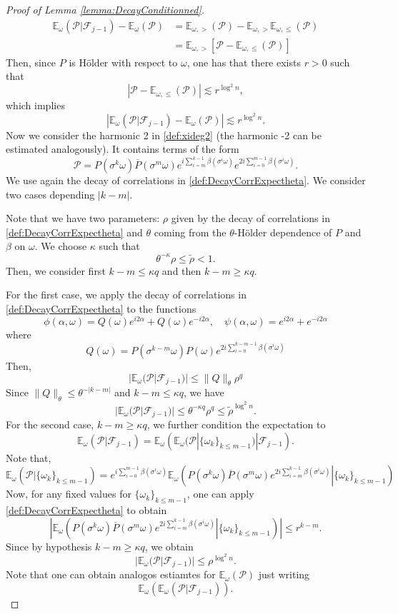 \documentclass[10pt,a4paper]{amsart}
\newcommand{\E}{\mathbb{E}}
\newcommand{\FF}{\mathcal{F}}
\newcommand{\PP}{\mathcal{P}}
\newcommand{\al}{\alpha}
\newcommand{\kk}{\kappa}
\newcommand{\ol}{\overline}
\newcommand{\rr}{\rho}
\newcommand{\wt}{\widetilde}
\begin{document}
\begin{proof}[Proof of Lemma \ref{lemma:DecayConditionned}]
\[
 \begin{split}
\E_\omega\left(\left. \PP\right|\FF_{j-1}\right)-\E_\omega\left( \PP\right)
&=  \E_{\omega,>}(\PP)-\E_{\omega,>}\E_{\omega,\leq}(\PP)\\
  &=\E_{\omega,>}\left[\PP-\E_{\omega,\leq}(\PP)\right]
 \end{split}
\]
Then, since $P$ is H\"older with respect to $\omega$, one has that there exists $r>0$ such that 
\[
 \left|\PP-\E_{\omega,\leq}(\PP)\right|\lesssim r^{\log^2n},
\]
which implies 
\[
\left|\E_\omega(\PP|\FF_{j-1})-\E_\omega(\PP)\right|\lesssim r^{\log^2n}.
\]
Now we consider the harmonic 2 in \eqref{def:xideg2} (the harmonic -2 can be estimated analogously). It contains terms of the form 
\[
\PP= P(\sigma^k\omega)\ol P(\sigma^m\omega)e^{i\sum_{i=m}^{k-1}\beta(\sigma^i\omega)}e^{2i\sum_{i=0}^{m-1}\beta(\sigma^i\omega)}.
\]
We use again the decay of correlations in \eqref{def:DecayCorrExpectheta}. We consider two cases depending $|k-m|$. 

Note that we have two parameters: $\rr$ given by the decay of correlations in \eqref{def:DecayCorrExpectheta} and $\theta$ coming from the $\theta$-H\"older dependence of $P$ and $\beta$ on $\omega$. We choose $\kk$ such that 
\[
 \theta^{-\kk}\rr\leq \wt \rr<1.
\]
Then, we consider first $k-m\leq \kk q$ and then $k-m\geq \kk q$. 

For the first case, we apply the decay of correlations  in \eqref{def:DecayCorrExpectheta} to the functions 
\[
\phi(\al,\omega)=Q(\omega)e^{i2\al}+ Q(\omega)e^{-i2\al},\quad \psi(\al,\omega)=e^{i2\al}+e^{-i2\al}
\]
where
\[
 Q(\omega)=P(\sigma^{k-m}\omega)P(\omega)e^{2i\sum_{i=0}^{k-m-1}\beta(\sigma^i\omega)}
\]
Then,
\[
 |\E_\omega(\PP|\FF_{j-1})|\leq \|Q\|_\theta \rr^q
\]
Since $\|Q\|_\theta\leq \theta^{-|k-m|}$ and $k-m\leq \kk q$, we have
\[
 |\E_\omega(\PP|\FF_{j-1})|\leq \theta^{-\kk q}\rr^q \leq \wt\rr^{\log^2n}.
\]
For the second case, $k-m\geq \kk q$, we further condition the expectation to 
\[
\E_\omega(\PP|\FF_{j-1})=\E_\omega\left(\E_\omega(\PP|\{\omega_k\}_{k\leq m-1})|\FF_{j-1}\right).
\]
Note that,
\[
 \E_\omega(\PP|\{\omega_k\}_{k\leq m-1})= e^{i\sum_{i=0}^{m-1}\beta(\sigma^i\omega)}\E_\omega\left(\left. P(\sigma^k\omega)\ol P(\sigma^m\omega)e^{2i\sum_{i=m}^{k-1}\beta(\sigma^i\omega)}\right|\{\omega_k\}_{k\leq m-1}\right)
\]
Now, for any fixed values for $\{\omega_k\}_{k\leq m-1}$, one can apply \eqref{def:DecayCorrExpectheta} to obtain 
\[
 \left|\E_\omega\left(\left. P(\sigma^k\omega)\ol P(\sigma^m\omega)e^{2i\sum_{i=m}^{k-1}\beta(\sigma^i\omega)}\right|\{\omega_k\}_{k\leq m-1}\right)\right|\leq r^{k-m}.
\]
Since by hypothesis $k-m\geq \kk q$, we obtain 
\[
|\E_\omega(\PP|\FF_{j-1})|\leq \rr^{\log^2 n}.
\]
Note that one can obtain analogos estiamtes for $\E_\omega(\PP)$ just writing
\[
\E_\omega\left( \E_\omega(\PP|\FF_{j-1})\right).
\]
\end{proof}
\end{document}
